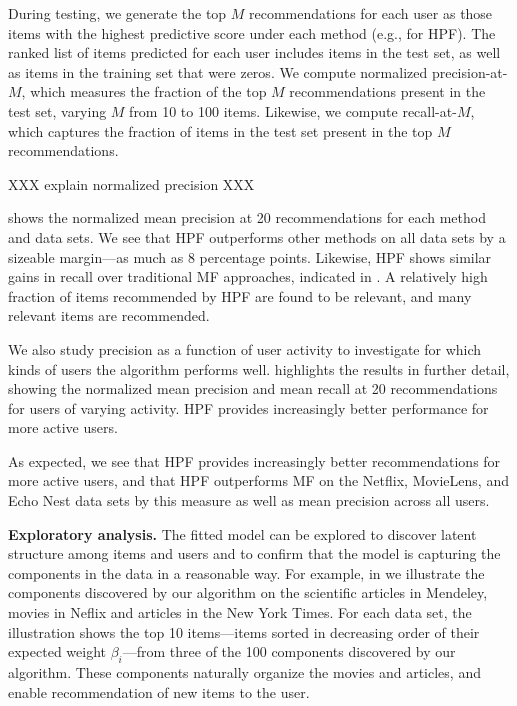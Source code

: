 During testing, we generate the top $M$ recommendations for each user
as those items with the highest predictive score under each method
(e.g.,  for HPF). The ranked list of items predicted for
each user includes items in the test set, as well as items in the
training set that were zeros. We compute normalized precision-at-$M$,
which measures the fraction of the top $M$ recommendations present in
the test set, varying $M$ from 10 to 100 items. Likewise, we compute
recall-at-$M$, which captures the fraction of items in the test set
present in the top $M$ recommendations.

XXX explain normalized precision XXX

 shows the normalized mean precision at 20
recommendations for each method and data sets. We see that HPF
outperforms other methods on all data sets by a sizeable margin---as
much as 8 percentage points. Likewise, HPF shows similar gains in
recall over traditional MF approaches, indicated in
. A relatively high fraction of items recommended
by HPF are found to be relevant, and many relevant items are
recommended.

We also study precision as a function of user activity to investigate
for which kinds of users the algorithm performs
well.  highlights the results
in further detail, showing the normalized mean precision and mean
recall at 20 recommendations for users of varying activity. HPF
provides increasingly better performance for more active users.

As expected, we see that HPF provides increasingly better
recommendations for more active users, and that HPF outperforms MF on
the Netflix, MovieLens, and Echo Nest data sets by this measure as
well as mean precision across all users.


{\bf Exploratory analysis.} The fitted model can be explored to
discover latent structure among items and users and to confirm that
the model is capturing the components in the data in a reasonable
way. For example, in  we illustrate the components
discovered by our algorithm on the scientific articles in Mendeley,
movies in Neflix and articles in the New York Times. For each data
set, the illustration shows the top 10 items---items sorted in
decreasing order of their expected weight $\beta_i$---from three of
the 100 components discovered by our algorithm. These components
naturally organize the movies and articles, and enable recommendation
of new items to the user.

